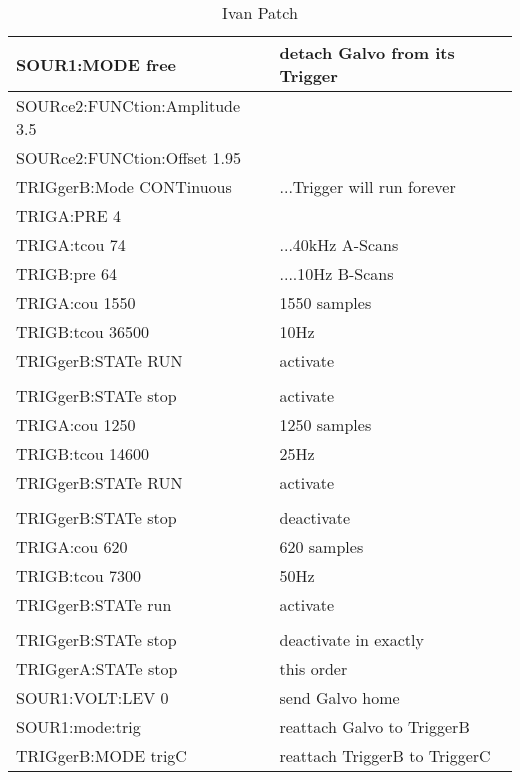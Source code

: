 		\begin{table}[h!]
		\scriptsize
			 \begin{tabular}{|p{5.5cm}|p{6cm}|} \hline
			SOUR1:MODE free				& detach Galvo from its Trigger	\\ \hline
			SOURce2:FUNCtion:Amplitude 3.5	& 	\\ \hline
			SOURce2:FUNCtion:Offset 1.95	& 	\\ \hline
			TRIGgerB:Mode CONTinuous	& ...Trigger will run forever	\\ \hline
			TRIGA:PRE 4	& 	\\ \hline
			TRIGA:tcou 74	&	...40kHz A-Scans	\\ \hline
			TRIGB:pre 64	&		....10Hz B-Scans 	\\ \hline
			TRIGA:cou 1550 	& 1550 samples	\\ \hline
			TRIGB:tcou 36500 	& 10Hz 	\\ \hline
			TRIGgerB:STATe RUN	& activate	\\ \hline
								& 			\\ \hline
			TRIGgerB:STATe stop	& activate	\\ \hline
			TRIGA:cou 1250 	& 1250 samples	\\ \hline
			TRIGB:tcou 14600	& 25Hz 	\\ \hline
			TRIGgerB:STATe RUN	& activate	\\ \hline
								& 			\\ \hline
			TRIGgerB:STATe stop	& deactivate	\\ \hline
			TRIGA:cou 620 	& 620 samples	\\ \hline
			TRIGB:tcou 7300	& 50Hz 	\\ \hline
			TRIGgerB:STATe run	& activate	\\ \hline
								& 			\\ \hline
			TRIGgerB:STATe stop	& deactivate in exactly	\\ \hline
			TRIGgerA:STATe stop	& this order	\\ \hline
			SOUR1:VOLT:LEV 0	& send Galvo home	\\ \hline
			SOUR1:mode:trig		& reattach Galvo to TriggerB	\\ \hline
			TRIGgerB:MODE trigC & reattach TriggerB to TriggerC \\ \hline
			 \end{tabular}
			 \caption{Ivan Patch }
		\end{table}	
